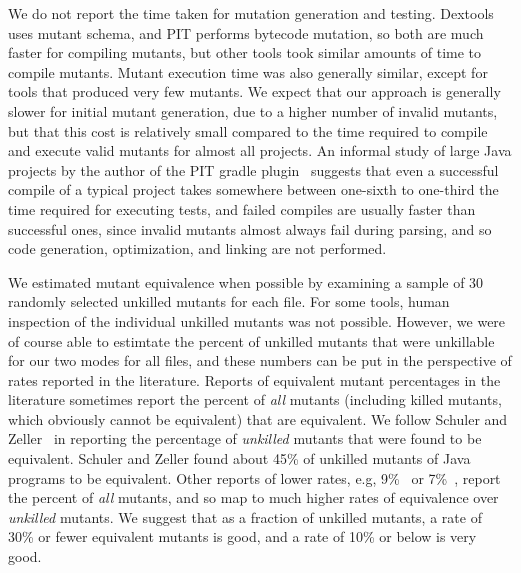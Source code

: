 \documentclass[acmsmall,screen,review,anonymous]{acmart}
\begin{document}
{We do not report the time taken for mutation generation and testing.
Dextools uses mutant schema, and PIT performs bytecode mutation, so
both are much faster for compiling mutants, but other tools took similar
amounts of time to compile mutants.   Mutant execution time was also
generally similar, except for tools that produced very few mutants.
We expect that our approach is generally slower for initial mutant
generation, due to a higher number of invalid mutants, but that this
cost is relatively small compared to the time required to compile and
execute valid mutants for almost all projects.  An informal study of
large Java projects by the author of the PIT gradle
plugin~\cite{mutantSlow}
  suggests that even a successful compile of a typical project takes
  somewhere between one-sixth to one-third the time required for
  executing tests, and failed compiles are usually faster than
  successful ones, since invalid mutants almost always fail during
  parsing, and so code generation, optimization, and linking are not performed.

We estimated mutant equivalence when possible by examining a sample of
30 randomly selected unkilled mutants for each file.  For some tools,
human inspection of the individual unkilled mutants was not possible.
However, we were of course able to estimtate the percent of unkilled
mutants that were unkillable for our two modes for all files, and
these numbers can be put in the perspective of rates reported in the
literature.  Reports of equivalent mutant percentages in the
literature sometimes report the percent of \emph{all} mutants
(including killed mutants, which obviously cannot be equivalent) that
are equivalent.  We follow Schuler and Zeller~\cite{EquivMut} in
reporting the percentage of \emph{unkilled} mutants that were found to
be equivalent.  Schuler and Zeller found about 45\% of unkilled
mutants of Java programs to be equivalent.  Other reports of lower
rates, e.g, 9\%~\cite{offutt1997automatically} or 7\%~\cite{TCE}, report the percent of
\emph{all} mutants, and so map to much higher rates of
equivalence over \emph{unkilled} mutants.  We suggest that as a
fraction of unkilled mutants, a rate of 30\% or fewer equivalent
mutants is good, and a rate of 10\% or below is very good.

}
\end{document}
